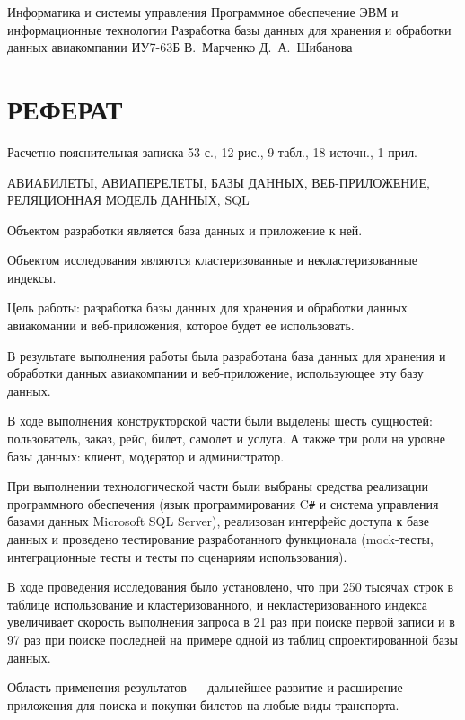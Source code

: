 \documentclass{bmstu}
\begin{document}
\makecourseworktitle
    {Информатика и системы управления}
    {Программное обеспечение ЭВМ и информационные технологии}
    {Разработка базы данных для хранения и обработки данных авиакомпании}
    {ИУ7-63Б}
    {В.~Марченко}
    {Д.~А.~Шибанова}
    {}
    {}
    
\setcounter{page}{3}

{\centering \chapter*{РЕФЕРАТ}}

Расчетно-пояснительная записка 53 с., 12 рис., 9 табл., 18 источн., 1 прил.

\noindent АВИАБИЛЕТЫ, АВИАПЕРЕЛЕТЫ, БАЗЫ ДАННЫХ, ВЕБ-ПРИЛОЖЕНИЕ, РЕЛЯЦИОННАЯ МОДЕЛЬ ДАННЫХ, SQL

Объектом разработки является база данных и приложение к ней.

Объектом исследования являются кластеризованные и некластеризованные индексы.

Цель работы: разработка базы данных для хранения и обработки данных авиакомании и веб-приложения, которое будет ее использовать.

В результате выполнения работы была разработана база данных для хранения и обработки данных авиакомпании и веб-приложение, использующее эту базу данных.

В ходе выполнения конструкторской части были выделены шесть сущностей: пользователь, заказ, рейс, билет, самолет и услуга. 
А также три роли на уровне базы данных: клиент, модератор и администратор.

При выполнении технологической части были выбраны средства реализации программного обеспечения (язык программирования C\texttt{\#} и система управления базами данных Microsoft SQL Server), реализован интерфейс доступа к базе данных и проведено тестирование разработанного функционала (mock-тесты, интеграционные тесты и тесты по сценариям использования).

В ходе проведения исследования было установлено, что при 250 тысячах строк в таблице использование и кластеризованного, и некластеризованного индекса увеличивает скорость выполнения запроса в 21 раз при поиске первой записи и в 97 раз при поиске последней на примере одной из таблиц спроектированной базы данных.

Область применения результатов --- дальнейшее развитие и расширение приложения для поиска и покупки билетов на любые виды транспорта.
\end{document}
